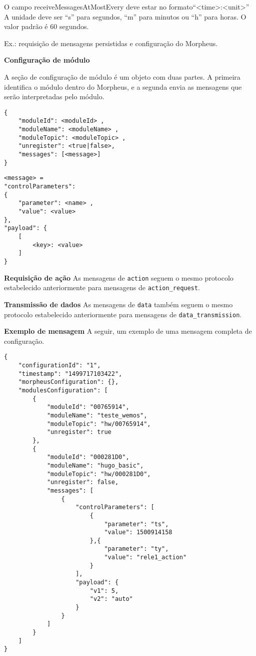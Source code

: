 O campo receiveMessagesAtMostEvery deve estar no formato“\textless time\textgreater :\textless unit\textgreater ”
A unidade deve ser “s” para segundos, “m” para minutos ou “h” para horas. O valor padrão é 60 segundos.

Ex.: requisição de mensagens persistidas e configuração do Morpheus.

\textbf{Configuração de módulo}

A seção de configuração de módulo é um objeto com duas partes. A primeira identifica o módulo dentro do Morpheus, e a segunda envia as mensagens que serão interpretadas pelo módulo.
\begin{lstlisting}
{
    "moduleId": <moduleId> ,
    "moduleName": <moduleName> ,
    "moduleTopic": <moduleTopic> ,
    "unregister": <true|false>,
    "messages": [<message>]
}
\end{lstlisting}

\begin{lstlisting}
<message> =
"controlParameters":
{
    "parameter": <name> ,
    "value": <value>
},
"payload": {
    [
        <key>: <value>
    ]
}
\end{lstlisting}

\textbf{Requisição de ação}
As mensagens de \texttt{action} seguem o mesmo protocolo estabelecido anteriormente para mensagens de \texttt{action\_request}.

\textbf{Transmissão de dados}
As mensagens de \texttt{data} também seguem o mesmo protocolo estabelecido anteriormente para mensagens de \texttt{data\_transmission}.

\textbf{Exemplo de mensagem}
A seguir, um exemplo de uma mensagem completa de configuração.

\begin{lstlisting}
{
    "configurationId": "1",
    "timestamp": "1499717103422",
    "morpheusConfiguration": {},
    "modulesConfiguration": [
        {
            "moduleId": "00765914",
            "moduleName": "teste_wemos",
            "moduleTopic": "hw/00765914",
            "unregister": true
    	},
    	{
            "moduleId": "000281D0",
            "moduleName": "hugo_basic",
            "moduleTopic": "hw/000281D0",
            "unregister": false,
            "messages": [
                {
                    "controlParameters": [
                        {
                            "parameter": "ts",
                            "value": 1500914158
                        },{
                            "parameter": "ty",
                            "value": "rele1_action"
                        }
                    ],
                    "payload": {
                        "v1": 5,
                        "v2": "auto"
                    }
                }
            ]
    	}
    ]
}
\end{lstlisting}

